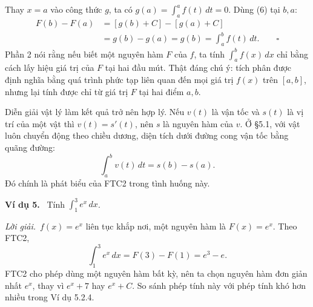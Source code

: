 \documentclass[12pt,a4paper]{article}
\newcommand{\ex}[1]{\par\medskip\noindent\textbf{Ví dụ #1.}\ }
\newcommand{\sol}{\par\nopagebreak[4]\noindent\textit{Lời giải.}\ }
\begin{document}
Thay $x=a$ vào công thức $g$, ta có $g(a)=\int_a^a f(t)\,dt=0$. Dùng (6) tại $b,a$:
\begin{align*}
F(b)-F(a)&=[g(b)+C]-[g(a)+C]\\
&=g(b)-g(a)=g(b)=\int_a^b f(t)\,dt.\qquad\square
\end{align*}
Phần 2 nói rằng nếu biết một nguyên hàm $F$ của $f$, ta tính $\int_a^b f(x)\,dx$ chỉ bằng cách lấy hiệu giá trị của $F$ tại hai đầu mút. Thật đáng chú ý: tích phân được định nghĩa bằng quá trình phức tạp liên quan đến mọi giá trị $f(x)$ trên $[a,b]$, nhưng lại tính được chỉ từ giá trị $F$ tại hai điểm $a,b$.

Diễn giải vật lý làm kết quả trở nên hợp lý. Nếu $v(t)$ là vận tốc và $s(t)$ là vị trí của một vật thì $v(t)=s'(t)$, nên $s$ là nguyên hàm của $v$. Ở §5.1, với vật luôn chuyển động theo chiều dương, diện tích dưới đường cong vận tốc bằng quãng đường:
\[\int_a^b v(t)\,dt=s(b)-s(a).\]
Đó chính là phát biểu của FTC2 trong tình huống này.
\ex{5} Tính $\int_1^3 e^x\,dx$.
\sol $f(x)=e^x$ liên tục khắp nơi, một nguyên hàm là $F(x)=e^x$. Theo FTC2,
\[\int_1^3e^x\,dx=F(3)-F(1)=e^3-e.\]
FTC2 cho phép dùng một nguyên hàm bất kỳ, nên ta chọn nguyên hàm đơn giản nhất $e^x$, thay vì $e^x+7$ hay $e^x+C$. So sánh phép tính này với phép tính khó hơn nhiều trong Ví dụ 5.2.4.
\end{document}
